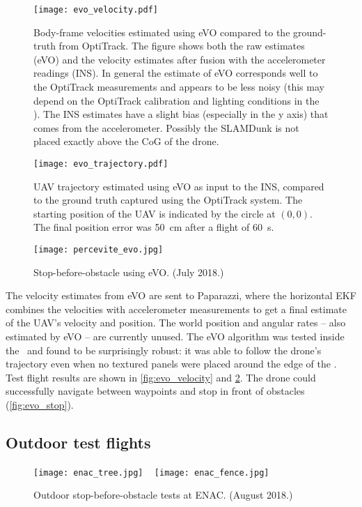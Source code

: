 \begin{figure}
\centering
\texttt{[image: evo\_velocity.pdf]}
\caption{Body-frame velocities estimated using \ac{eVO} compared to the ground-truth from OptiTrack. The figure shows both the raw estimates (eVO) and the velocity estimates after fusion with the accelerometer readings (INS). In general the estimate of \ac{eVO} corresponds well to the OptiTrack measurements and appears to be less noisy (this may depend on the OptiTrack calibration and lighting conditions in the \cyberzoo). The INS estimates have a slight bias (especially in the y axis) that comes from the accelerometer. Possibly the SLAMDunk is not placed exactly above the \ac{CoG} of the drone.}
\label{fig:evo_velocity}
\end{figure}

\begin{figure}
\centering
\texttt{[image: evo\_trajectory.pdf]}
\caption{\ac{UAV} trajectory estimated using \ac{eVO} as input to the INS, compared to the ground truth captured using the OptiTrack system. The starting position of the \ac{UAV} is indicated by the circle at $(0,0)$. The final position error was \SI{50}{\centi\meter} after a flight of \SI{60}{\s}.}
\label{fig:evo_trajectory}
\end{figure}

\begin{figure}
\centering
\texttt{[image: percevite\_evo.jpg]}
\caption{Stop-before-obstacle using \ac{eVO}. (July 2018.)}
\label{fig:evo_stop}
\end{figure}

The velocity estimates from \ac{eVO} are sent to Paparazzi, where the horizontal \ac{EKF} combines the velocities with accelerometer measurements to get a final estimate of the \ac{UAV}'s velocity and position.
The world position and angular rates -- also estimated by \ac{eVO} -- are currently unused.
The \ac{eVO} algorithm was tested inside the \cyberzoo\ and found to be surprisingly robust: it was able to follow the drone's trajectory even when no textured panels were placed around the edge of the \cyberzoo.
Test flight results are shown in \autoref{fig:evo_velocity} and \ref{fig:evo_trajectory}.
The drone could successfully navigate between waypoints and stop in front of obstacles (\autoref{fig:evo_stop}).




\subsection{Outdoor test flights}
\begin{figure}
\centering
\texttt{[image: enac\_tree.jpg]}
~
\texttt{[image: enac\_fence.jpg]}
\caption{Outdoor stop-before-obstacle tests at \acs{ENAC}. (August 2018.)}
\label{fig:enac_obstacle}
\end{figure}

